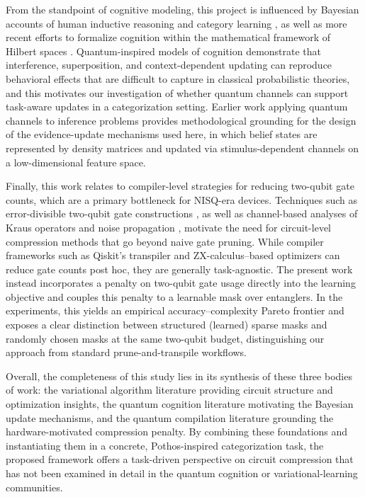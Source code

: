 \documentclass[conference]{IEEEtran}
\begin{document}
From the standpoint of cognitive modeling, this project is influenced by Bayesian accounts of human inductive reasoning and category learning \cite{b1,b2,b11}, as well as more recent efforts to formalize cognition within the mathematical framework of Hilbert spaces \cite{b3}. Quantum-inspired models of cognition demonstrate that interference, superposition, and context-dependent updating can reproduce behavioral effects that are difficult to capture in classical probabilistic theories, and this motivates our investigation of whether quantum channels can support task-aware updates in a categorization setting. Earlier work applying quantum channels to inference problems \cite{b8,b9} provides methodological grounding for the design of the evidence-update mechanisms used here, in which belief states are represented by density matrices and updated via stimulus-dependent channels on a low-dimensional feature space.

Finally, this work relates to compiler-level strategies for reducing two-qubit gate counts, which are a primary bottleneck for NISQ-era devices. Techniques such as error-divisible two-qubit gate constructions \cite{b10}, as well as channel-based analyses of Kraus operators and noise propagation \cite{b12,b13}, motivate the need for circuit-level compression methods that go beyond naive gate pruning. While compiler frameworks such as Qiskit's transpiler and ZX-calculus–based optimizers can reduce gate counts post hoc, they are generally task-agnostic. The present work instead incorporates a penalty on two-qubit gate usage directly into the learning objective and couples this penalty to a learnable mask over entanglers. In the experiments, this yields an empirical accuracy–complexity Pareto frontier and exposes a clear distinction between structured (learned) sparse masks and randomly chosen masks at the same two-qubit budget, distinguishing our approach from standard prune-and-transpile workflows.

Overall, the completeness of this study lies in its synthesis of these three bodies of work: the variational algorithm literature providing circuit structure and optimization insights, the quantum cognition literature motivating the Bayesian update mechanisms, and the quantum compilation literature grounding the hardware-motivated compression penalty. By combining these foundations and instantiating them in a concrete, Pothos-inspired categorization task, the proposed framework offers a task-driven perspective on circuit compression that has not been examined in detail in the quantum cognition or variational-learning communities.
\end{document}
